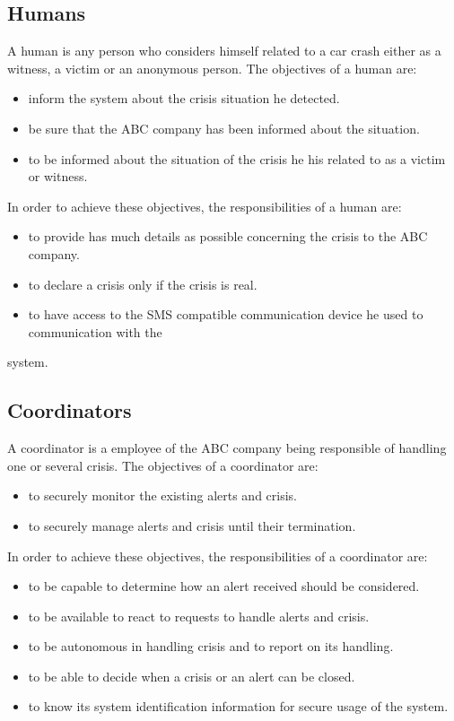 \subsection{Humans}
A human is any person who considers himself related to a car crash either as a
witness, a victim or an anonymous person. The objectives of a human are:
\begin{itemize}
\item inform the \msrprojectname system about the crisis situation he detected.
\item be sure that the ABC company has been informed about the situation.
\item to be informed about the situation of the crisis he his related to as a
 victim or witness.
\end{itemize}
In order to achieve these objectives, the responsibilities of a human are:
\begin{itemize}
\item to provide has much details as possible concerning the crisis to the ABC
 company.
\item  to declare a crisis only if the crisis is real.
\item  to have access to the SMS compatible communication device he used to
 communication with the
\end{itemize}
\msrprojectname system.
\subsection{Coordinators}
A coordinator is a employee of the ABC company being responsible of handling one
or several crisis. The objectives of a coordinator are:
\begin{itemize}
\item   to securely monitor the existing alerts and crisis.
\item   to securely manage alerts and crisis until their termination.
\end{itemize}
In order to achieve these objectives, the responsibilities of a coordinator are:
\begin{itemize}
\item   to be capable to determine how an alert received should be considered.
\item   to be available to react to requests to handle alerts and crisis.
\item   to be autonomous in handling crisis and to report on its handling.
\item   to be able to decide when a crisis or an alert can be closed.
\item   to know its system identification information for secure usage of the
system.
\end{itemize}
